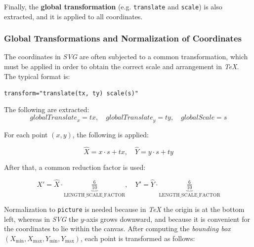 Finally, the \textbf{global transformation} (e.g. \texttt{translate} and \texttt{scale}) is also extracted, and it is applied to all coordinates.

\subsubsection{Global Transformations and Normalization of Coordinates}
\hspace*{2.5em}The coordinates in \textit{SVG} are often subjected to a common transformation, which must be applied in order to obtain the correct scale and arrangement in \textit{TeX}. The typical format is:

\vspace{-0.3cm}

\begin{center}
	\texttt{transform="translate(tx, ty) scale(s)"}
\end{center}

\vspace{-0.2cm}

The following are extracted:
\[
\mathit{globalTranslate}_x = tx, \quad
\mathit{globalTranslate}_y = ty, \quad
\mathit{globalScale} = s
\]

\vspace{-0.2cm}

For each point \((x,y)\), the following is applied:

\vspace{-0.2cm}

\begin{equation}
	\widehat{X} = x \cdot s + tx, \quad
	\widehat{Y} = y \cdot s + ty
	\label{eq:svg-transform}
\end{equation}

After that, a common reduction factor is used:

\begin{equation}
	X' = \widehat{X} \cdot \underbrace{\tfrac{6}{10}}_{\text{LENGTH\_SCALE\_FACTOR}},\quad
	Y' = \widehat{Y} \cdot \underbrace{\tfrac{6}{10}}_{\text{LENGTH\_SCALE\_FACTOR}}
	\label{eq:svg-scale}
\end{equation}

Normalization to \texttt{picture} is needed because in \textit{TeX} the origin is at the bottom left, whereas in \textit{SVG} the \(y\)-axis grows downward, and because it is convenient for the coordinates to lie within the canvas. After computing the \textit{bounding box} \((X_{\min},X_{\max},Y_{\min},Y_{\max})\), each point is transformed as follows:

